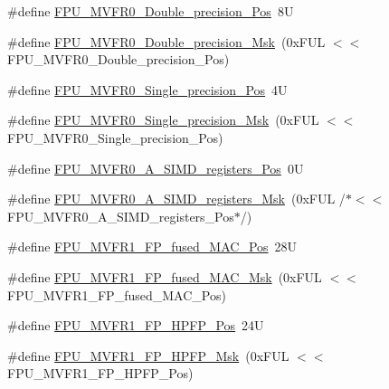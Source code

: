 \begin{DoxyCompactItemize}
\item 
\#define \mbox{\hyperlink{group___c_m_s_i_s___f_p_u_ga461e26147be0c39402a78cb6249e8f84}{F\+P\+U\+\_\+\+M\+V\+F\+R0\+\_\+\+Double\+\_\+precision\+\_\+\+Pos}}~8U
\item 
\#define \mbox{\hyperlink{group___c_m_s_i_s___f_p_u_ga3f2c8c6c759ffe70f548a165602ea901}{F\+P\+U\+\_\+\+M\+V\+F\+R0\+\_\+\+Double\+\_\+precision\+\_\+\+Msk}}~(0x\+F\+U\+L $<$$<$ F\+P\+U\+\_\+\+M\+V\+F\+R0\+\_\+\+Double\+\_\+precision\+\_\+\+Pos)
\item 
\#define \mbox{\hyperlink{group___c_m_s_i_s___f_p_u_ga1b4e9fe31992b1495c7a158747d42571}{F\+P\+U\+\_\+\+M\+V\+F\+R0\+\_\+\+Single\+\_\+precision\+\_\+\+Pos}}~4U
\item 
\#define \mbox{\hyperlink{group___c_m_s_i_s___f_p_u_ga95008f205c9d25e4ffebdbdc50d5ae44}{F\+P\+U\+\_\+\+M\+V\+F\+R0\+\_\+\+Single\+\_\+precision\+\_\+\+Msk}}~(0x\+F\+U\+L $<$$<$ F\+P\+U\+\_\+\+M\+V\+F\+R0\+\_\+\+Single\+\_\+precision\+\_\+\+Pos)
\item 
\#define \mbox{\hyperlink{group___c_m_s_i_s___f_p_u_gaa1de44af3e3162c8c176a57564611618}{F\+P\+U\+\_\+\+M\+V\+F\+R0\+\_\+\+A\+\_\+\+S\+I\+M\+D\+\_\+registers\+\_\+\+Pos}}~0U
\item 
\#define \mbox{\hyperlink{group___c_m_s_i_s___f_p_u_ga118f13f9562805356e92b5ad52573021}{F\+P\+U\+\_\+\+M\+V\+F\+R0\+\_\+\+A\+\_\+\+S\+I\+M\+D\+\_\+registers\+\_\+\+Msk}}~(0x\+F\+U\+L /$\ast$$<$$<$ F\+P\+U\+\_\+\+M\+V\+F\+R0\+\_\+\+A\+\_\+\+S\+I\+M\+D\+\_\+registers\+\_\+\+Pos$\ast$/)
\item 
\#define \mbox{\hyperlink{group___c_m_s_i_s___f_p_u_ga68c53771f02f4c73122a7b40796549cc}{F\+P\+U\+\_\+\+M\+V\+F\+R1\+\_\+\+F\+P\+\_\+fused\+\_\+\+M\+A\+C\+\_\+\+Pos}}~28U
\item 
\#define \mbox{\hyperlink{group___c_m_s_i_s___f_p_u_gaf5129ab18948ff573a1ab29f0be47bc2}{F\+P\+U\+\_\+\+M\+V\+F\+R1\+\_\+\+F\+P\+\_\+fused\+\_\+\+M\+A\+C\+\_\+\+Msk}}~(0x\+F\+U\+L $<$$<$ F\+P\+U\+\_\+\+M\+V\+F\+R1\+\_\+\+F\+P\+\_\+fused\+\_\+\+M\+A\+C\+\_\+\+Pos)
\item 
\#define \mbox{\hyperlink{group___c_m_s_i_s___f_p_u_ga02ceac0abcbdc8670633056bec005bfd}{F\+P\+U\+\_\+\+M\+V\+F\+R1\+\_\+\+F\+P\+\_\+\+H\+P\+F\+P\+\_\+\+Pos}}~24U
\item 
\#define \mbox{\hyperlink{group___c_m_s_i_s___f_p_u_gafe29dd327ed3b723b3f01759568e116d}{F\+P\+U\+\_\+\+M\+V\+F\+R1\+\_\+\+F\+P\+\_\+\+H\+P\+F\+P\+\_\+\+Msk}}~(0x\+F\+U\+L $<$$<$ F\+P\+U\+\_\+\+M\+V\+F\+R1\+\_\+\+F\+P\+\_\+\+H\+P\+F\+P\+\_\+\+Pos)
\item 

\end{DoxyCompactItemize}
